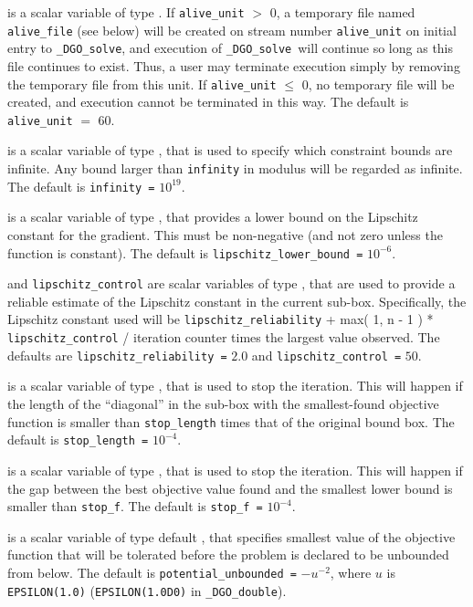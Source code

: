\documentclass{galahad}
\newcommand{\packagename}{DGO}
\newcommand{\fullpackagename}{\libraryname\_\packagename}
\newcommand{\solver}{{\tt \fullpackagename\_solve}}
\begin{document}
\begin{description}
 is a scalar variable of type \integer.
If {\tt alive\_unit} $>$ 0, a temporary file named {\tt alive\_file} (see below)
will be created on stream number {\tt alive\_unit} on initial entry to
\solver, and execution of \solver\ will continue so
long as this file continues to exist. Thus, a user may terminate execution
simply by removing the temporary file from this unit.
If {\tt alive\_unit} $\leq$ 0, no temporary file will be created, and
execution cannot be terminated in this way.
The default is {\tt alive\_unit} $=$ 60.

 is a scalar variable of type \realdp, that is used to
specify which constraint bounds are infinite.
Any bound larger than {\tt infinity} in modulus will be regarded as infinite.
The default is {\tt infinity =} $10^{19}$.

 is a scalar variable of type \realdp, 
that provides a lower bound on the Lipschitz constant for the gradient.
This must be non-negative (and not zero unless the function is constant).
The default is {\tt lipschitz\_lower\_bound =} $10^{-6}$.

 and {\tt lipschitz\_control} are scalar variables 
of type \realdp, that are used to provide a reliable estimate of 
the Lipschitz constant in the current sub-box. 
Specifically, the Lipschitz constant used will be
{\tt lipschitz\_reliability} + max( 1, n - 1 ) * {\tt lipschitz\_control} 
/ iteration counter times the largest value observed.
The defaults are {\tt lipschitz\_reliab\-ility =} $2.0$ and
{\tt lipschitz\_control =} $50$.

 is a scalar variable of type \realdp, that is 
used to stop the iteration. This will happen if the length of the ``diagonal''
in the sub-box with the smallest-found objective function is smaller than 
{\tt stop\_length} times that of the original bound box.
The default is {\tt stop\_length =} $10^{-4}$.

 is a scalar variable of type \realdp, that is used to
stop the iteration. This will happen if the gap between the best objective 
value found and the smallest lower bound is smaller than {\tt stop\_f}.
The default is {\tt stop\_f =} $10^{-4}$.

  is a scalar variable of type default
\realdp, that specifies smallest
value of the objective function that will be tolerated before the problem
is declared to be unbounded from below.
The default is {\tt potential\_u\-nbounded =} $-u^{-2}$,
where $u$ is {\tt EPSILON(1.0)} ({\tt EPSILON(1.0D0)} in
{\tt \fullpackagename\_double}).


\end{description}
\end{document}
